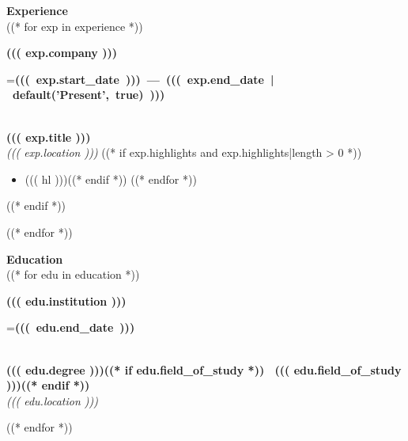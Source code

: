 \documentclass[11pt,a4paper]{article}
\begin{document}
\begin{minipage}[t]{\textwidth}
\begin{minipage}[t]{0.9\textwidth}
\vspace{35pt}

\noindent
\begin{minipage}[t]{0.62\textwidth}
\vspace{0pt}


{\color{teal-pri}\faCircle\space\space\space\bfseries\large Experience}\\[15pt]
((* for exp in experience *))
\hspace{15pt}
\begin{minipage}{0.92\linewidth}
{\fontsize{10.5}{12}\selectfont\bfseries ((( exp.company )))} \hfill {\scriptsize\color{white}=\hbox{\textbf{((( exp.start_date ))) --- ((( exp.end_date | default('Present', true) )))}} }\\[2pt]
{\fontsize{9.5}{11}\selectfont\bfseries ((( exp.title )))}\\[2pt]
{\scriptsize\color{teal-pri}\textit{((( exp.location )))}}
((* if exp.highlights and exp.highlights|length > 0 *))
\begin{itemize}[leftmargin=12pt, itemsep=2pt, parsep=0pt, topsep=4pt]
((* for hl in exp.highlights *))((* if hl *))\item {\fontsize{8.5}{11.5}\selectfont ((( hl )))}((* endif *))
((* endfor *))
\end{itemize}
((* endif *))
\end{minipage}
\vspace{15pt}
((* endfor *))

{\color{teal-pri}\faCircle\space\space\space\bfseries\large Education}\\[15pt]
((* for edu in education *))
\hspace{15pt}
\begin{minipage}{0.92\linewidth}
{\fontsize{10.5}{12}\selectfont\bfseries ((( edu.institution )))} \hfill {\scriptsize\color{white}=\hbox{\textbf{((( edu.end_date )))}} }\\[2pt]
{\fontsize{9.5}{11}\selectfont\bfseries ((( edu.degree )))((* if edu.field_of_study *)) \textbar\ ((( edu.field_of_study )))((* endif *))}\\[2pt]
{\scriptsize\color{teal-pri}\textit{((( edu.location )))}}
\end{minipage}
\vspace{12pt}
((* endfor *))


\end{minipage}
\end{minipage}
\end{minipage}
\end{document}
